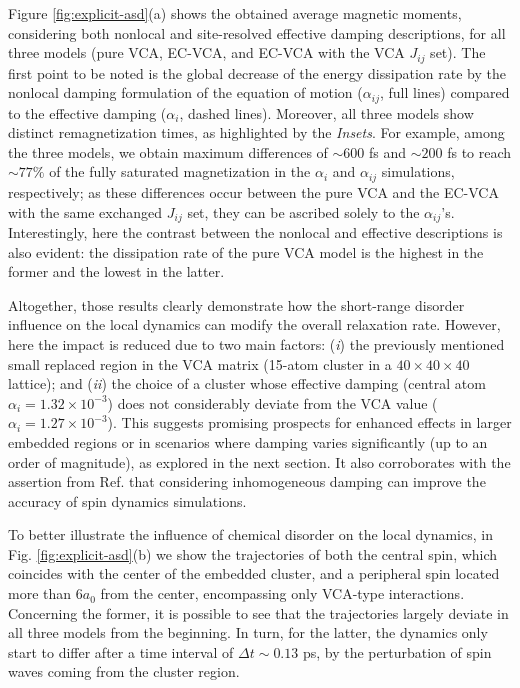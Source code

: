 Figure \ref{fig:explicit-asd}(a) shows the obtained average magnetic moments, considering both nonlocal and site-resolved effective damping descriptions, for all three models (pure VCA, EC-VCA, and EC-VCA with the VCA $J_{ij}$ set). The first point to be noted is the global decrease of the energy dissipation rate by the nonlocal damping formulation of the equation of motion ($\alpha_{ij}$, full lines) compared to the effective damping ($\alpha_i$, dashed lines). Moreover, all three models show distinct remagnetization times, as highlighted by the \textit{Insets}. For example, among the three models, we obtain maximum differences  of $\sim600$ fs and $\sim200$ fs to reach $\sim77\%$ of the fully saturated magnetization in the $\alpha_i$ and $\alpha_{ij}$ simulations, respectively; as these differences occur between the pure VCA and the EC-VCA with the same exchanged $J_{ij}$ set, they can be ascribed solely to the $\alpha_{ij}$'s. Interestingly, here the contrast between the nonlocal and effective descriptions is also evident: the dissipation rate of the pure VCA model is the highest in the former and the lowest in the latter.

Altogether, those results clearly demonstrate how the short-range disorder influence on the local dynamics can modify the overall relaxation rate. However, here the impact is reduced due to two main factors: (\textit{i}) the previously mentioned small replaced region in the VCA matrix (15-atom cluster in a $40\times40\times40$  lattice); and (\textit{ii}) the choice of a cluster whose effective damping (central atom $\alpha_i=1.32\times10^{-3}$) does not considerably deviate from the VCA value ($\alpha_i=1.27\times10^{-3}$). This suggests promising prospects for enhanced effects in larger embedded regions or in scenarios where damping varies significantly (up to an order of magnitude), as explored in the next section. It also corroborates with the assertion from Ref. \cite{PhysRevB.109.094417} that considering inhomogeneous damping can improve the accuracy of spin dynamics simulations.

To better illustrate the influence of chemical disorder on the local dynamics, in Fig. \ref{fig:explicit-asd}(b) we show the trajectories of both the central spin, which coincides with the center of the embedded cluster, and a peripheral spin located more than $6a_0$ from the center, encompassing only VCA-type interactions. Concerning the former, it is possible to see that the trajectories largely deviate in all three models from the beginning. In turn, for the latter, the dynamics only start to differ after a time interval of $\Delta t\sim 0.13$ ps, by the perturbation of spin waves coming from the cluster region.


